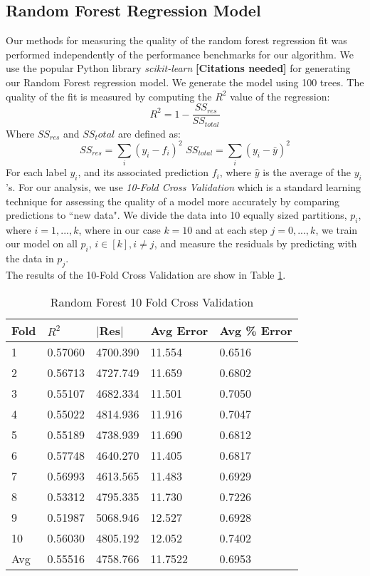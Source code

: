 \documentclass[10.5pt,journal]{IEEEtran}
\begin{document}
	\subsection{Random Forest Regression Model}
		Our methods for measuring the quality of the random forest regression fit was performed independently
		of the performance benchmarks for our algorithm. We use the popular Python library {\it{scikit-learn}}
		{\bf{[Citations needed]}}
		for generating our Random Forest regression model. We generate the model using 100 trees. The quality
		of the fit is measured by computing the $R^2$ value of the regression:
			\[R^2 = 1 - \frac{SS_{res}}{SS_{total}}\]
			Where $SS_{res}$ and $SS_total$ are defined as:
			\[SS_{res} = \sum_i (y_i-f_i)^2 \,\, SS_{total} = \sum_i (y_i-\bar{y})^2\]
		For each label $y_i$, and its associated prediction $f_i$, where $\hat{y}$ is the average of
		the $y_i$'s. For our analysis, we use {\it{10-Fold Cross Validation}} which is a standard
		learning technique for assessing the quality of a model more accurately by comparing predictions
		to ``new data". We divide the data into 10 equally sized partitions, $p_i$, where $i=1,...,k$, where
		in our case $k=10$ and at each step $j = 0,...,k$, we train our model on all $p_i$, $i\in [k],
		i\ne j$, and measure the residuals by predicting with the data in $p_j$. \\
		
		The results of the 10-Fold Cross Validation are show in Table \ref{fig:crossval_tbl}. \\
		
		\begin{table}[h!] \normalsize
			\caption{Random Forest 10 Fold Cross Validation}
			\centering
			\begin{tabular}{|l|l|l|l|l|} \hline
			Fold    & $R^2$ & $|$Res$|$ & Avg Error    & Avg \% Error \\ \hline 
			1       & 0.57060        & 4700.390  & 11.554 	& 0.6516      \\
			2       & 0.56713        & 4727.749  & 11.659 	& 0.6802        \\
			3       & 0.55107        & 4682.334  & 11.501  	& 0.7050       \\
			4       & 0.55022        & 4814.936  & 11.916 	& 0.7047        \\
			5       & 0.55189        & 4738.939  & 11.690 	& 0.6812        \\
			6       & 0.57748        & 4640.270 & 11.405 	& 0.6817        \\
			7       & 0.56993        & 4613.565  & 11.483 	& 0.6929        \\
			8       & 0.53312        & 4795.335  & 11.730 	& 0.7226        \\
			9       & 0.51987        & 5068.946  & 12.527  	& 0.6928       \\
			10      & 0.56030        & 4805.192  & 12.052  	& 0.7402        \\ \hline
			Avg		& 0.55516        & 4758.766 & 11.7522 	& 0.6953        \\ \hline
			\end{tabular}
			\label{fig:crossval_tbl}
		\end{table}
		
\end{document}
